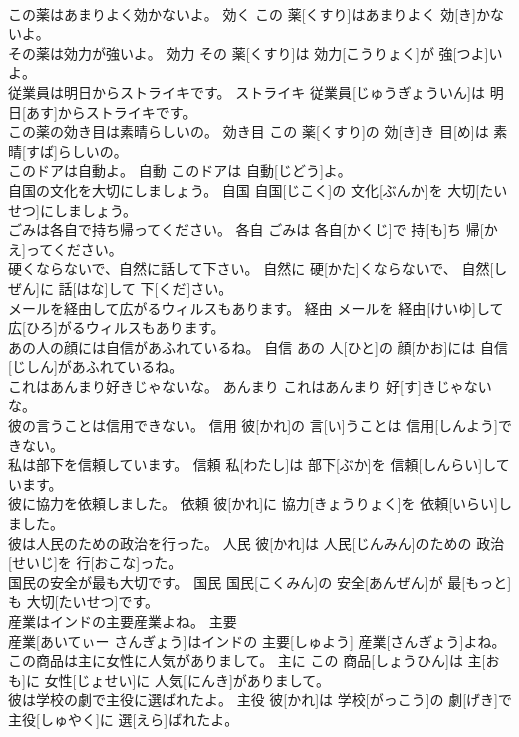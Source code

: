 \documentclass[8pt]{extreport}
\begin{document}
\begin{CJK}{UTF8}{min}
\\	この薬はあまりよく効かないよ。	効く	この 薬[くすり]はあまりよく 効[き]かないよ。	
\\	その薬は効力が強いよ。	効力	その 薬[くすり]は 効力[こうりょく]が 強[つよ]いよ。	
\\	従業員は明日からストライキです。	ストライキ	従業員[じゅうぎょういん]は 明日[あす]からストライキです。	
\\	この薬の効き目は素晴らしいの。	効き目	この 薬[くすり]の 効[き]き 目[め]は 素晴[すば]らしいの。	
\\	このドアは自動よ。	自動	このドアは 自動[じどう]よ。	
\\	自国の文化を大切にしましょう。	自国	自国[じこく]の 文化[ぶんか]を 大切[たいせつ]にしましょう。	
\\	ごみは各自で持ち帰ってください。	各自	ごみは 各自[かくじ]で 持[も]ち 帰[かえ]ってください。	
\\	硬くならないで、自然に話して下さい。	自然に	硬[かた]くならないで、 自然[しぜん]に 話[はな]して 下[くだ]さい。	
\\	メールを経由して広がるウィルスもあります。	経由	メールを 経由[けいゆ]して 広[ひろ]がるウィルスもあります。	
\\	あの人の顔には自信があふれているね。	自信	あの 人[ひと]の 顔[かお]には 自信[じしん]があふれているね。	
\\	これはあんまり好きじゃないな。	あんまり	これはあんまり 好[す]きじゃないな。	
\\	彼の言うことは信用できない。	信用	彼[かれ]の 言[い]うことは 信用[しんよう]できない。	
\\	私は部下を信頼しています。	信頼	私[わたし]は 部下[ぶか]を 信頼[しんらい]しています。	
\\	彼に協力を依頼しました。	依頼	彼[かれ]に 協力[きょうりょく]を 依頼[いらい]しました。	
\\	彼は人民のための政治を行った。	人民	彼[かれ]は 人民[じんみん]のための 政治[せいじ]を 行[おこな]った。	
\\	国民の安全が最も大切です。	国民	国民[こくみん]の 安全[あんぜん]が 最[もっと]も 大切[たいせつ]です。	
\\	産業はインドの主要産業よね。	主要	
\\	産業[あいてぃー さんぎょう]はインドの 主要[しゅよう] 産業[さんぎょう]よね。	
\\	この商品は主に女性に人気がありまして。	主に	この 商品[しょうひん]は 主[おも]に 女性[じょせい]に 人気[にんき]がありまして。	
\\	彼は学校の劇で主役に選ばれたよ。	主役	彼[かれ]は 学校[がっこう]の 劇[げき]で 主役[しゅやく]に 選[えら]ばれたよ。	

\end{CJK}
\end{document}
